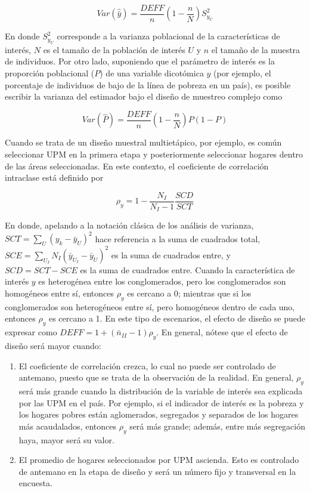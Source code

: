 \documentclass[
  12pt,
]{book}
\providecommand{\tightlist}{%
  \setlength{\itemsep}{0pt}\setlength{\parskip}{0pt}}
\begin{document}
\[
Var(\hat{\bar{y}}) = \frac{DEFF}{n}\left(1-\frac{n}{N}\right)S^2_{y_U}
\]

En donde \(S^2_{y_U}\) corresponde a la varianza poblacional de la características de interés, \(N\) es el tamaño de la población de interés \(U\) y \(n\) el tamaño de la muestra de individuos. Por otro lado, suponiendo que el parámetro de interés es la proporción poblacional (\(P\)) de una variable dicotómica \(y\) (por ejemplo, el porcentaje de individuos de bajo de la línea de pobreza en un país), es posible escribir la varianza del estimador bajo el diseño de muestreo complejo como

\[
Var(\hat P) = \frac{DEFF}{n}\left(1-\frac{n}{N}\right)P(1-P)
\]

Cuando se trata de un diseño muestral multietápico, por ejemplo, es común seleccionar UPM en la primera etapa y posteriormente seleccionar hogares dentro de las áreas seleccionadas. En este contexto, el coeficiente de correlación intraclase está definido por

\[
\rho_y=1-\frac{N_I}{N_I-1}\frac{SCD}{SCT}
\]

En donde, apelando a la notación clásica de los análisis de varianza, \(SCT=\sum_{U}{(y_k-{\bar{y}}_U)}^2\) hace referencia a la suma de cuadrados total, \(SCE=\sum_{U_I} N_I{({\bar{y}}_{U_I}-{\bar{y}}_U)}^2\) es la suma de cuadrados entre, y \(SCD=SCT-SCE\) es la suma de cuadrados entre. Cuando la característica de interés \(y\) es heterogénea entre los conglomerados, pero los conglomerados son homogéneos entre sí, entonces \(\rho_y\) es cercano a 0; mientras que si los conglomerados son heterogéneos entre sí, pero homogéneos dentro de cada uno, entonces \(\rho_y\) es cercano a 1. En este tipo de escenarios, el efecto de diseño se puede expresar como \(DEFF = 1 + (\bar{n}_{II}-1)\rho_y\). En general, nótese que el efecto de diseño será mayor cuando:

\begin{enumerate}
\def\labelenumi{\arabic{enumi}.}
\tightlist
\item
  El coeficiente de correlación crezca, lo cual no puede ser controlado de antemano, puesto que se trata de la observación de la realidad. En general, \(\rho_y\) será más grande cuando la distribución de la variable de interés sea explicada por las UPM en el país. Por ejemplo, si el indicador de interés es la pobreza y los hogares pobres están aglomerados, segregados y separados de los hogares más acaudalados, entonces \(\rho_y\) será más grande; además, entre más segregación haya, mayor será su valor.
\item
  El promedio de hogares seleccionados por UPM ascienda. Esto es controlado de antemano en la etapa de diseño y será un número fijo y transversal en la encuesta.
\end{enumerate}
\end{document}
